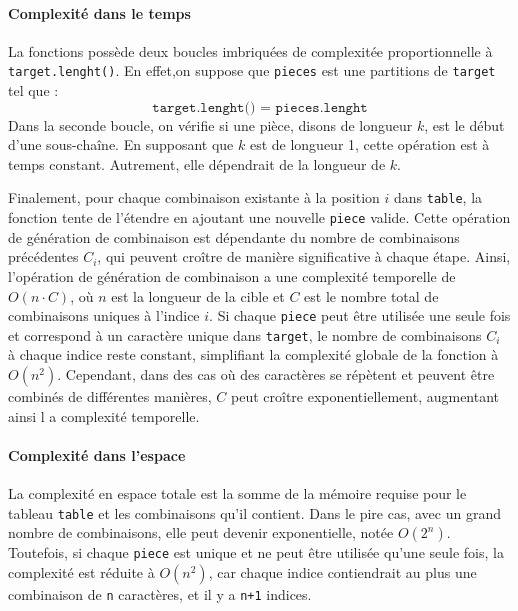 \documentclass[10pt]{report}
\begin{document}
  \paragraph{Complexité dans le temps}
  La fonctions possède deux boucles imbriquées de complexitée proportionnelle à
  \texttt{target.lenght()}. En effet,on suppose que \texttt{pieces} est une partitions de \texttt{target}   
  tel que :
  \[ \texttt{target.lenght() = pieces.lenght}  \]
  Dans la seconde boucle, on vérifie si une pièce, disons de longueur $k$, 
  est le début d'une sous-chaîne. En supposant que $k$ est de longueur 1, cette opération 
  est à temps constant. Autrement, elle dépendrait de la longueur de $k$.


  Finalement, pour chaque combinaison existante à la position $i$ dans \texttt{table}, 
  la fonction tente de l'étendre en ajoutant une nouvelle \texttt{piece} valide. 
  Cette opération de génération de combinaison est dépendante du nombre de
  combinaisons précédentes $C_i$, qui peuvent croître de manière significative 
  à chaque étape. Ainsi, l'opération de génération de combinaison a une 
  complexité temporelle de $O(n \cdot C)$, où $n$ est la longueur de la 
  cible et $C$ est le nombre total de combinaisons uniques à l'indice $i$. 
  Si chaque \texttt{piece} peut être utilisée une seule fois et correspond 
  à un caractère unique dans \texttt{target}, le nombre de combinaisons $C_i$ 
  à chaque indice reste constant, simplifiant la complexité globale de la fonction à $O(n^2)$.
  Cependant, dans des cas où des caractères se répètent et peuvent être combinés de
  différentes manières, $C$ peut croître exponentiellement, augmentant ainsi l
  a complexité temporelle.


  \paragraph{Complexité dans l'espace}
  La complexité en espace totale est la somme de la mémoire requise pour le tableau 
  \texttt{table} et les combinaisons qu'il contient. Dans le pire cas, avec un grand nombre de 
  combinaisons, elle peut devenir exponentielle, notée \( O(2^n) \). Toutefois, si chaque 
  \texttt{piece} est unique et ne peut être utilisée qu'une seule fois, la complexité est 
  réduite à \( O(n^2) \), car chaque indice contiendrait au plus une combinaison de \texttt{n} 
  caractères, et il y a \texttt{n+1} indices.
\end{document}
